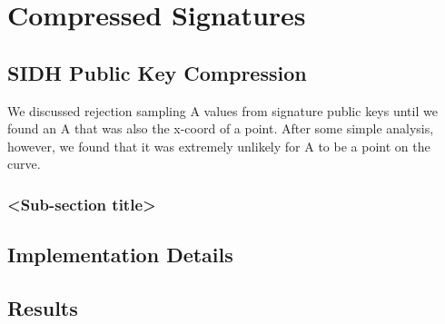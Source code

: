 \chapter{Compressed Signatures}

\section{SIDH Public Key Compression}

We discussed rejection sampling A values from signature public keys until we found an A that was also the x-coord of a point. After some simple analysis, however, we found that it was extremely unlikely for A to be a point on the curve.\\

\subsection{<Sub-section title>}

\section{Implementation Details}

\section{Results}

